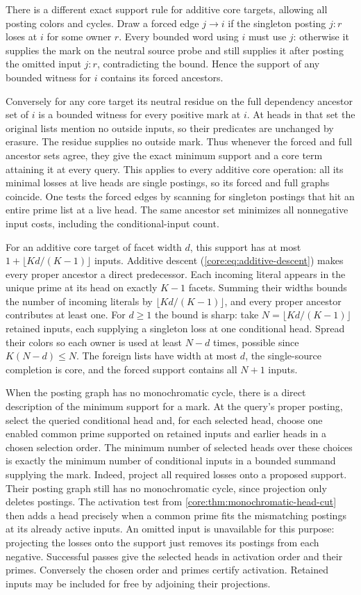 There is a different exact support rule for additive
core targets, allowing all posting colors and cycles.
Draw a forced edge $j\to i$ if the singleton posting
$j:r$ loses at $i$ for some owner $r$. Every bounded
word using $i$ must use $j$: otherwise it supplies
the mark on the neutral source probe and still
supplies it after posting the omitted input $j:r$,
contradicting the bound. Hence the support of any
bounded witness for $i$ contains its forced ancestors.

Conversely for any core target its neutral residue
on the full dependency ancestor set of $i$ is a
bounded witness for every positive mark at $i$.
At heads in that set the original lists mention
no outside inputs, so their predicates are unchanged
by erasure. The residue supplies no outside mark.
Thus whenever the forced and full ancestor sets
agree, they give the exact minimum support and
a core term attaining it at every query. This
applies to every additive core operation: all its
minimal losses at live heads are single postings,
so its forced and full graphs coincide. One tests
the forced edges by scanning for singleton postings
that hit an entire prime list at a live head.
The same ancestor set minimizes all nonnegative
input costs, including the conditional-input count.

For an additive core target of facet width $d$,
this support has at most
$1+\lfloor Kd/(K-1)\rfloor$ inputs. Additive
descent (\cref{core:eq:additive-descent}) makes
every proper ancestor a direct predecessor. Each
incoming literal appears in the unique prime at
its head on exactly $K-1$ facets. Summing their
widths bounds the number of incoming literals by
$\lfloor Kd/(K-1)\rfloor$, and every proper
ancestor contributes at least one. For $d\ge1$ the
bound is sharp: take $N=\lfloor Kd/(K-1)\rfloor$
retained inputs, each supplying a singleton loss
at one conditional head. Spread their colors so
each owner is used at least $N-d$ times, possible
since $K(N-d)\le N$. The foreign lists have
width at most $d$, the single-source completion
is core, and the forced support contains all
$N+1$ inputs.

When the posting graph has no monochromatic
cycle, there is a direct description of the
minimum support for a mark.
At the query's proper posting, select the queried
conditional head and, for each selected head,
choose one enabled common prime supported on
retained inputs and earlier heads in a chosen
selection order.
The minimum number of selected heads over these
choices is exactly the minimum number of
conditional inputs in a bounded summand supplying
the mark. Indeed, project all required losses
onto a proposed support. Their posting graph
still has no monochromatic cycle, since projection
only deletes postings. The activation test from
\cref{core:thm:monochromatic-head-cut} then adds a head precisely when
a common prime fits the mismatching postings at
its already active inputs.
An omitted input is unavailable for this purpose:
projecting the losses onto the support just removes
its postings from each negative. Successful passes
give the selected heads in activation order and
their primes. Conversely the chosen order and
primes certify activation. Retained inputs may be
included for free by adjoining their projections.

